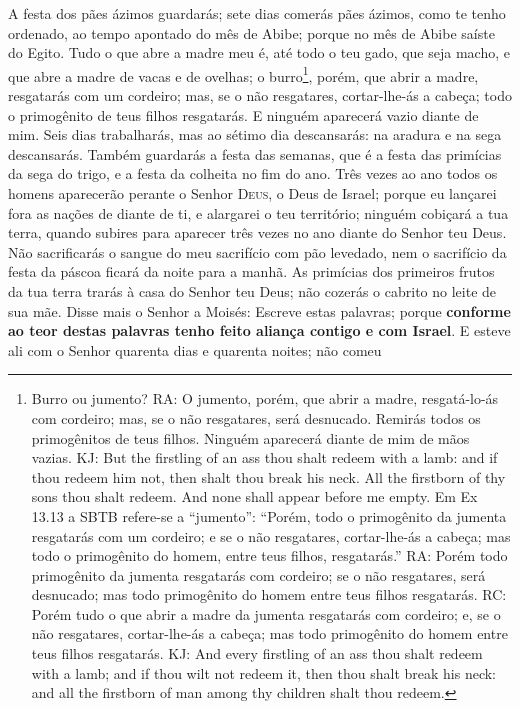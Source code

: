A festa dos pães ázimos guardarás; sete dias comerás pães ázimos,
como te tenho ordenado, ao tempo apontado do mês de Abibe; porque no
mês de Abibe saíste do Egito. Tudo o que abre a madre meu é,
até todo o teu gado, que seja macho, e que abre a madre de vacas e
de ovelhas; o burro\footnote{Burro ou jumento? RA: O jumento,
porém, que abrir a madre, resgatá-lo-ás com cordeiro; mas, se o não
resgatares, será desnucado. Remirás todos os primogênitos de teus
filhos. Ninguém aparecerá diante de mim de mãos vazias. KJ: But the
firstling of an ass thou shalt redeem with a lamb: and if thou
redeem him not, then shalt thou break his neck. All the firstborn of
thy sons thou shalt redeem. And none shall appear before me empty.
Em Ex 13.13 a SBTB refere-se a ``jumento'': ``Porém, todo o
primogênito da jumenta resgatarás com um cordeiro; e se o não
resgatares, cortar-lhe-ás a cabeça; mas todo o primogênito do homem,
entre teus filhos, resgatarás.'' RA: Porém todo primogênito da
jumenta resgatarás com cordeiro; se o não resgatares, será
desnucado; mas todo primogênito do homem entre teus filhos
resgatarás. RC: Porém tudo o que abrir a madre da jumenta resgatarás
com cordeiro; e, se o não resgatares, cortar-lhe-ás a cabeça; mas
todo primogênito do homem entre teus filhos resgatarás. KJ: And
every firstling of an ass thou shalt redeem with a lamb; and if thou
wilt not redeem it, then thou shalt break his neck: and all the
firstborn of man among thy children shalt thou redeem.}, porém, que
abrir a madre, resgatarás com um cordeiro; mas, se o não resgatares,
cortar-lhe-ás a cabeça; todo o primogênito de teus filhos
resgatarás. E ninguém aparecerá vazio diante de mim. Seis
dias trabalharás, mas ao sétimo dia descansarás: na aradura e na
sega descansarás. Também guardarás a festa das semanas, que é
a festa das primícias da sega do trigo, e a festa da colheita no fim
do ano. Três vezes ao ano todos os homens aparecerão perante
o Senhor \textsc{Deus}, o Deus de Israel; porque eu lançarei
fora as nações de diante de ti, e alargarei o teu território;
ninguém cobiçará a tua terra, quando subires para aparecer três
vezes no ano diante do Senhor teu Deus. Não sacrificarás o
sangue do meu sacrifício com pão levedado, nem o sacrifício da festa
da páscoa ficará da noite para a manhã. As primícias dos
primeiros frutos da tua terra trarás à casa do Senhor teu Deus; não
cozerás o cabrito no leite de sua mãe. Disse mais o Senhor a
Moisés: Escreve estas palavras; porque \textbf{conforme ao teor
destas palavras tenho feito aliança contigo e com Israel}. E
esteve ali com o Senhor quarenta dias e quarenta noites; não comeu
